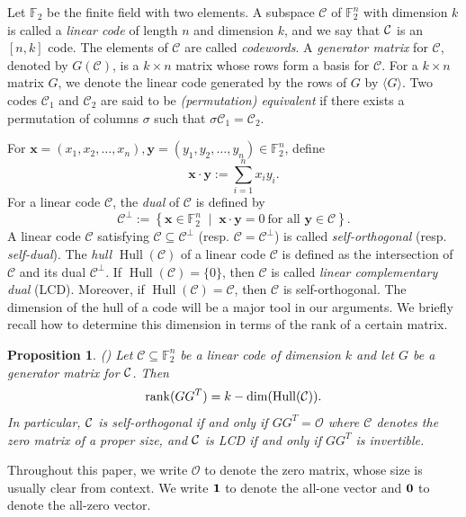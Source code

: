 \documentclass{article}
\newtheorem{prop}[theorem]{Proposition}
\theoremstyle{definition}
\theoremstyle{remark}
\newcommand{\C}{\mbox{$\cal C$}}
\newcommand{\F}{\mathbb{F}}
\newcommand{\Hull}{\operatorname{Hull}}
\newcommand{\rank}{\operatorname{rank}}
\def\CC{{\mathcal C}}
\def\x{{\mathbf x}}
\def\y{{\mathbf y}}
\begin{document}
Let $\mathbb{F}_2$ be the finite field with two elements.
A subspace $\CC$ of $\mathbb{F}_2^n$ with dimension $k$ is called a {\it linear code} of length $n$ and dimension $k$, and we say that $\C$ is an $[n, k]$ code.
The elements of $\CC$ are called {\it codewords}. A {\it generator matrix} for $\CC$, denoted by $G(\CC)$, is a $k\times n$ matrix whose rows form a basis for $\CC$. For a $k\times n$ matrix $G$, we denote the linear code generated by the rows of $G$ by $\langle G\rangle$. Two codes $\mathcal{C}_1$ and $\mathcal{C}_2$ are said to be {\it (permutation) equivalent} if there exists a permutation of columns $\sigma$ such that $\sigma\mathcal{C}_1=\mathcal{C}_2$.

For $\x = (x_1,x_2,\ldots,x_n),\y = (y_1,y_2,\ldots,y_n) \in \mathbb{F}_2^n$, define 
\[
\x \cdot \y := \sum_{i=1}^n x_iy_i.
\]
For a linear code $\CC$, the {\it dual} of $\CC$ is defined by
\[
\CC^{\perp} := \left\{ \x \in \mathbb{F}_2^n \; \middle| \; \x \cdot \y =0\: {\mbox{for  all }} \y \in \CC\right\}.
\]
A linear code $\CC$ satisfying $\CC \subseteq \CC^\perp$ (resp. $\CC = \CC^\perp$) is called {\it self-orthogonal} (resp. {\it self-dual}). The {\it hull} $\operatorname{Hull}(\mathcal{C})$ of a linear code $\mathcal{C}$ is defined as the intersection of $\mathcal{C}$ and its dual $\mathcal{C}^\perp$. If $\operatorname{Hull}(\mathcal{C})=\{0\}$, then $\mathcal{C}$ is called {\it linear complementary dual} (LCD). Moreover, if $\operatorname{Hull}(\mathcal{C})=\mathcal{C}$, then $\mathcal{C}$ is self-orthogonal. The dimension of the hull of a code will be a major tool in our arguments. We briefly recall how to determine this dimension in terms of the rank of a certain matrix.
\begin{prop}{\rm(\cite[Proposition 3.1]{GueJitGul})} \label{prop-hull}
Let $\mathcal{C} \subseteq \F_2^n$ be a linear code of dimension $k$ and let $G$ be a generator matrix for $\C$.  Then
\[
\rank(G G^T) = k - \dim(\Hull(\C)).
\]
In particular, $\C$ is self-orthogonal if and only if $GG^T= \mathcal{O}$ where $\mathcal{C}$ denotes the zero matrix of a proper size, and $\C$ is LCD if and only if $GG^T$ is invertible.
\end{prop}

Throughout this paper, we write $\mathcal{O}$ to denote the zero matrix, whose size is usually clear from context. We write ${\bf{1}}$ to denote the all-one vector and ${\bf{0}}$ to denote the all-zero vector.
\end{document}
